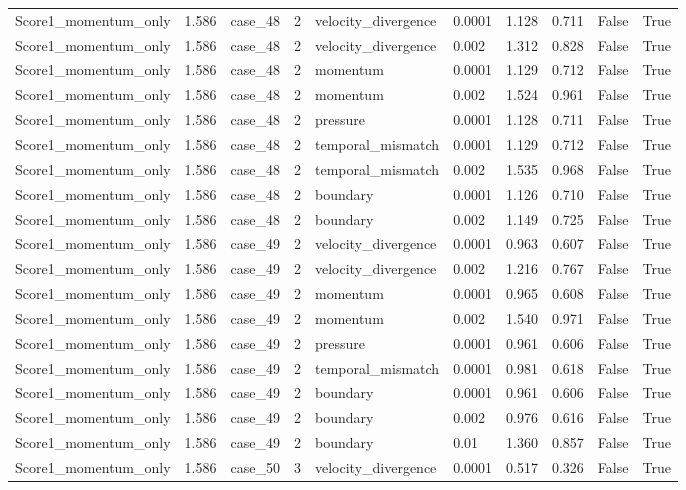 \begin{longtable}{llllllllll}
Score1\_momentum\_only & 1.586 & case\_48 & 2 & velocity\_divergence & 0.0001 & 1.128 & 0.711 & False & True \\
Score1\_momentum\_only & 1.586 & case\_48 & 2 & velocity\_divergence & 0.002 & 1.312 & 0.828 & False & True \\
Score1\_momentum\_only & 1.586 & case\_48 & 2 & momentum & 0.0001 & 1.129 & 0.712 & False & True \\
Score1\_momentum\_only & 1.586 & case\_48 & 2 & momentum & 0.002 & 1.524 & 0.961 & False & True \\
Score1\_momentum\_only & 1.586 & case\_48 & 2 & pressure & 0.0001 & 1.128 & 0.711 & False & True \\
Score1\_momentum\_only & 1.586 & case\_48 & 2 & temporal\_mismatch & 0.0001 & 1.129 & 0.712 & False & True \\
Score1\_momentum\_only & 1.586 & case\_48 & 2 & temporal\_mismatch & 0.002 & 1.535 & 0.968 & False & True \\
Score1\_momentum\_only & 1.586 & case\_48 & 2 & boundary & 0.0001 & 1.126 & 0.710 & False & True \\
Score1\_momentum\_only & 1.586 & case\_48 & 2 & boundary & 0.002 & 1.149 & 0.725 & False & True \\
Score1\_momentum\_only & 1.586 & case\_49 & 2 & velocity\_divergence & 0.0001 & 0.963 & 0.607 & False & True \\
Score1\_momentum\_only & 1.586 & case\_49 & 2 & velocity\_divergence & 0.002 & 1.216 & 0.767 & False & True \\
Score1\_momentum\_only & 1.586 & case\_49 & 2 & momentum & 0.0001 & 0.965 & 0.608 & False & True \\
Score1\_momentum\_only & 1.586 & case\_49 & 2 & momentum & 0.002 & 1.540 & 0.971 & False & True \\
Score1\_momentum\_only & 1.586 & case\_49 & 2 & pressure & 0.0001 & 0.961 & 0.606 & False & True \\
Score1\_momentum\_only & 1.586 & case\_49 & 2 & temporal\_mismatch & 0.0001 & 0.981 & 0.618 & False & True \\
Score1\_momentum\_only & 1.586 & case\_49 & 2 & boundary & 0.0001 & 0.961 & 0.606 & False & True \\
Score1\_momentum\_only & 1.586 & case\_49 & 2 & boundary & 0.002 & 0.976 & 0.616 & False & True \\
Score1\_momentum\_only & 1.586 & case\_49 & 2 & boundary & 0.01 & 1.360 & 0.857 & False & True \\
Score1\_momentum\_only & 1.586 & case\_50 & 3 & velocity\_divergence & 0.0001 & 0.517 & 0.326 & False & True \\

\end{longtable}
